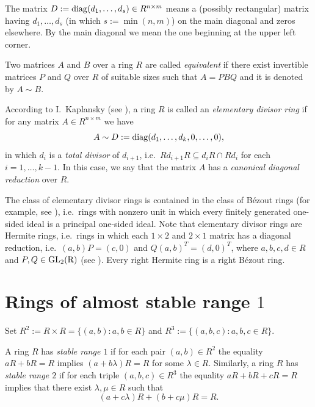 \documentclass[12pt,a4paper, reqno]{amsart}
\def\GL{\rm GL}
\def\diag{{\rm diag}}
\begin{document}
The matrix $D:=\diag(d_{1},\ldots,d_{s})\in R^{n\times m}$ means a (possibly rectangular) matrix  having $d_{1},\ldots, d_{s}$ (in which $s:=\min(n,m)$) on the main diagonal and zeros elsewhere.  By the main diagonal we mean the one beginning at the upper left corner.



Two matrices $A$ and $B$ over a ring $R$ are called {\it equivalent}  if there exist invertible matrices $P$ and $Q$ over $R$ of  suitable sizes such  that $A=PBQ$ and it  is denoted by $A\sim B$.

According to I.~Kaplansky (see \cite[p.\,465]{7-kaplansky}),    a ring $R$ is called an {\it elementary divisor ring} if for any matrix $A\in R^{n\times m}$ we have
\begin{equation}\label{Eq:1}
A\sim D:=\diag(d_1,\ldots,d_k,0,\ldots,0),
\end{equation}
in which  $d_{i}$ is a {\it total divisor} of $d_{i+1}$, i.e.~$Rd_{i+1}R\subseteq d_iR\cap Rd_i$ for each $i=1,\ldots, k-1$.
In this case, we say that  the matrix $A$ has a  {\it canonical diagonal reduction} over $R$.



The class of elementary divisor rings is contained in the class of B\'ezout rings (for example, see \cite{7-kaplansky, Mon_Shchedryk, 12-zabavsky}),
i.e.~rings with nonzero unit in which every finitely generated one-sided ideal is a principal one-sided ideal.
Note that elementary divisor rings are Hermite rings, i.e.~rings in which each  $1\times 2$ and $2\times 1$ matrix   has a  diagonal reduction,
i.e.~$(a,b)P=(c,0)$ and \linebreak
$Q(a, b)^T=(d,0)^T$, where    $a, b, c, d\in R$ and   $P, Q\in \GL_2(R)$  (see \cite{7-kaplansky, 12-zabavsky}).  Every  right Hermite ring is a  right B\'ezout ring.


\section{Rings of almost stable range $1$}

Set
$R^2:=R\times R=\big\{(a,b) : a,b\in R\big\}$  and $R^3:=\big\{(a,b,c) : a,b,c\in R\big\}$.


A ring  $R$ has  {\it stable range $1$} if for each pair $(a,b)\in R^2$ the equality $aR+bR=R$ implies $(a+b\lambda)R=R$ for some $\lambda\in R$.
Similarly, a ring  $R$ has  {\it stable range $2$} if for each triple \linebreak
$(a,b,c)\in R^3$ the equality $aR+bR+cR=R$ implies that there  exist $\lambda,\mu\in R$ such that
\[
(a+c\lambda)R+(b+c\mu)R=R.
\]
\end{document}
